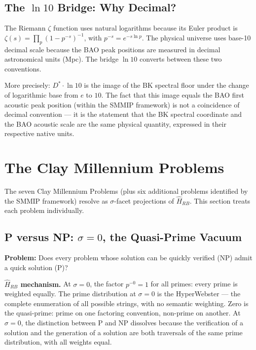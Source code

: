 \documentclass[12pt,a4paper]{article}
\theoremstyle{definition}
\theoremstyle{remark}
\newcommand{\Hrb}{\hat{H}_{RB}}
\newcommand{\Dstar}{D^*}
\begin{document}
\subsection{The $\ln 10$ Bridge: Why Decimal?}

The Riemann $\zeta$ function uses natural logarithms because its Euler product is
$\zeta(s) = \prod_p (1-p^{-s})^{-1}$, with $p^{-s} = e^{-s\ln p}$.
The physical universe uses base-10 decimal scale because the BAO peak positions
are measured in decimal astronomical units (Mpc).
The bridge $\ln 10$ converts between these two conventions.

More precisely: $\Dstar\cdot\ln 10$ is the image of the BK spectral floor under
the change of logarithmic base from $e$ to $10$.
The fact that this image equals the BAO first acoustic peak position (within the
SMMIP framework) is not a coincidence of decimal convention ---
it is the statement that the BK spectral coordinate and the BAO acoustic scale
are the same physical quantity, expressed in their respective native units.

\section{The Clay Millennium Problems}
\label{sec:clay}

The seven Clay Millennium Problems (plus six additional problems identified by the
SMMIP framework) resolve as $\sigma$-facet projections of $\Hrb$.
This section treats each problem individually.

\subsection{P versus NP: $\sigma=0$, the Quasi-Prime Vacuum}

\textbf{Problem:} Does every problem whose solution can be quickly verified ($\mathrm{NP}$)
admit a quick solution ($\mathrm{P}$)?

\textbf{$\Hrb$ mechanism.}
At $\sigma=0$, the factor $p^{-0} = 1$ for all primes: every prime is weighted equally.
The prime distribution at $\sigma=0$ is the HyperWebster --- the complete enumeration
of all possible strings, with no semantic weighting.
Zero is the quasi-prime: prime on one factoring convention, non-prime on another.
At $\sigma=0$, the distinction between P and NP dissolves because the verification
of a solution and the generation of a solution are both traversals of the same
prime distribution, with all weights equal.
\end{document}
